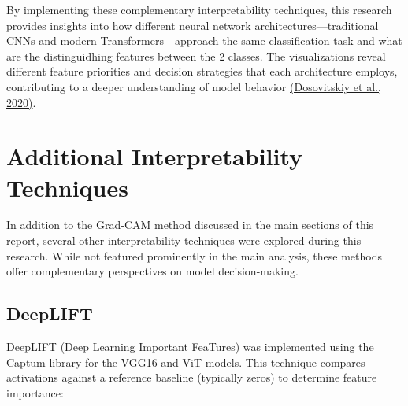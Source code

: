 \documentclass[a4paper,12pt]{report}
\begin{document}

By implementing these complementary interpretability techniques, this research provides insights into how different neural network architectures—traditional CNNs and modern Transformers—approach the same classification task and what are the distinguidhing features between the 2 classes. The visualizations reveal different feature priorities and decision strategies that each architecture employs, contributing to a deeper understanding of model behavior \href{https://arxiv.org/abs/2010.11929}{(Dosovitskiy et al., 2020)}.

\appendix
\section{Additional Interpretability Techniques}
\label{appendix:add_interpret}

In addition to the Grad-CAM method discussed in the main sections of this report, several other interpretability techniques were explored during this research. While not featured prominently in the main analysis, these methods offer complementary perspectives on model decision-making.

\subsection{DeepLIFT}

DeepLIFT (Deep Learning Important FeaTures) was implemented using the Captum library for the VGG16 and ViT models. This technique compares activations against a reference baseline (typically zeros) to determine feature importance:
\end{document}
